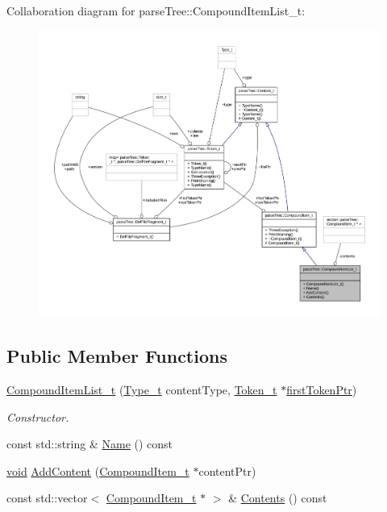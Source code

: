 Collaboration diagram for parse\+Tree\+:\+:Compound\+Item\+List\+\_\+t\+:
\nopagebreak
\begin{figure}[H]
\begin{center}
\leavevmode
\includegraphics[width=350pt]{structparse_tree_1_1_compound_item_list__t__coll__graph}
\end{center}
\end{figure}
\subsection*{Public Member Functions}
\begin{DoxyCompactItemize}
\item 
\hyperlink{structparse_tree_1_1_compound_item_list__t_aa11b5ce1861d50aa4cd43004c6f59141}{Compound\+Item\+List\+\_\+t} (\hyperlink{structparse_tree_1_1_content__t_a45cc4a193beac87a2045a2f6b6870d1b}{Type\+\_\+t} content\+Type, \hyperlink{structparse_tree_1_1_token__t}{Token\+\_\+t} $\ast$\hyperlink{structparse_tree_1_1_compound_item__t_a587020c943e760cb0152dd8cd31e21ef}{first\+Token\+Ptr})
\begin{DoxyCompactList}\small\item\em Constructor. \end{DoxyCompactList}\item 
const std\+::string \& \hyperlink{structparse_tree_1_1_compound_item_list__t_aef242f06ce8ad7f1588a3aae2fc66906}{Name} () const 
\item 
\hyperlink{_t_e_m_p_l_a_t_e__cdef_8h_ac9c84fa68bbad002983e35ce3663c686}{void} \hyperlink{structparse_tree_1_1_compound_item_list__t_a8dd9e44d584a7b3586304adcda985810}{Add\+Content} (\hyperlink{structparse_tree_1_1_compound_item__t}{Compound\+Item\+\_\+t} $\ast$content\+Ptr)
\item 
const std\+::vector$<$ \hyperlink{structparse_tree_1_1_compound_item__t}{Compound\+Item\+\_\+t} $\ast$ $>$ \& \hyperlink{structparse_tree_1_1_compound_item_list__t_a6ba12c61195421877c9bb71bd0bfbab7}{Contents} () const 
\end{DoxyCompactItemize}
